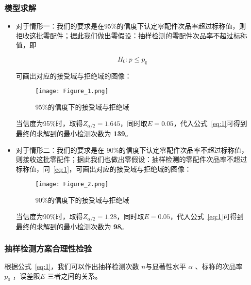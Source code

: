 \documentclass[utf8]{ctexart} %
\begin{document}
		\subsubsection{模型求解}
		\begin{itemize}
			\item 对于情形一：我们的要求是在95\%的信度下认定零配件次品率超过标称值，则拒收这批零配件；据此我们做出零假设：抽样检测的零配件次品率不超过标称值，即
			
			\begin{equation}
				H_0: p \leq p_0
				\label{eq:2}
			\end{equation}
	
			
			可画出对应的接受域与拒绝域的图像：
			
			\begin{figure}[H] %
				\centering
				\texttt{[image: Figure\_1.png]}
				\caption{95\%的信度下的接受域与拒绝域}
				\label{fig:label}
			\end{figure}
			
			
			当信度为95\%时，取得$Z_{\alpha/2} = 1.645$，同时取\( E = 0.05	\)，代入公式~\eqref{eq:1}可得到最终的求解到的最小检测次数为 \textbf{139}。
			
			
			
			\item 对于情形二：我们的要求是在 90\%的信度下认定零配件次品率不超过标称值，则接收这批零配件；据此我们也做出零假设：抽样检测的零配件次品率不超过标称值，同~\eqref{eq:1}，可画出对应的接受域与拒绝域的图像：
			
			
			
			\begin{figure}[H] %
				\centering
				\texttt{[image: Figure\_2.png]}
				\caption{90\%的信度下的接受域与拒绝域}
				\label{fig:label}
			\end{figure}
			
			
			当信度为90\%时，取得$Z_{\alpha/2} = 1.28$，同时取\( E = 0.05	\)，代入公式~\eqref{eq:1}可得到最终的求解到的最小检测次数为 \textbf{98}。
			
			
			
			
		\end{itemize}
		
		\subsubsection{抽样检测方案合理性检验}
		
		根据公式~\eqref{eq:1}，我们可以作出抽样检测次数 \( n \)与显著性水平 \( \alpha \) 、标称的次品率 \( p_0 \) ，误差限\( E \) 三者之间的关系。
		
\end{document}
